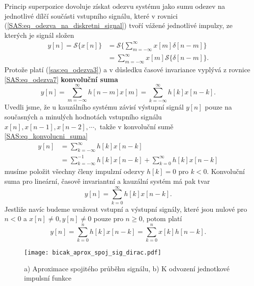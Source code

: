       Princip superpozice dovoluje získat odezvu systému jako sumu odezev na jednotlivé dílčí
      součásti vstupního signálu, které v rovnici (\ref{SAS:eq_odezva_na_diskretni_signal}) tvoří
      vážené jednotlivé impulzy, ze kterých je signál složen
      \begin{align}
        y[n]=\mathcal{S}\{x[n]\}
          &=\mathcal{S}\{\sum_{m=-\infty}^{\infty}x[m]\delta[n-m]\}  \nonumber \\
          &=\sum_{m=-\infty}^{\infty}x[m]\mathcal{S}\{\delta[n-m]\}. \label{SAS:eq_odezva7}
      \end{align}
      Protože platí (\ref{sas:eq_odezva3}) a v důsledku časové invariance vyplývá z rovnice
      \ref{SAS:eq_odezva7} \textbf{konvoluční suma} 
      \begin{equation}\label{SAS:eq_konvolucni_suma}
        y[n]=\sum_{m=-\infty}^{\infty}h[n-m]x[m]=\sum_{k=-\infty}^{\infty}h[k]x[n-k].
      \end{equation}
      Uvedli jsme, že u kauzálního systému závisí výstupní signál $y[n]$ pouze na současných a
      minulých hodnotách vstupního signálu $x[n], x[n-1], x[n-2], \cdots ,$ takže v konvoluční sumě
      \ref{SAS:eq_konvolucni_suma}
      \begin{align}
        y[n]&=\sum_{k=-\infty}^{\infty}h[k]x[n-k]                              \nonumber \\
            &=\sum_{k=-\infty}^{-1}h[k]x[n-k] + \sum_{k=0}^{\infty}h[k]x[n-k]  \label{tky:eq001}
      \end{align}
      musíme položit všechny členy impulzní odezvy $h[k]=0$ pro $k<0$. Konvoluční suma pro
      lineární, časově invariantní a kauzální systém má pak tvar
      \begin{equation}\label{SAS:eq_konvolucni_suma3}
        y[n]=\sum_{k=0}^{\infty}h[k]x[n-k].
      \end{equation}
      Jestliže navíc budeme uvažovat vstupní a výstupní signály, které jsou nulové pro $n<0$ a
      $x[n]\neq0, y[n]\neq0$ pouze pro $n\geq0$, potom platí
      \begin{equation}\label{SAS:eq_konvolucni_suma4}
        y[n]=\sum_{k=0}^{n}h[k]x[n-k]=\sum_{k=0}^{n}x[k]h[n-k].
      \end{equation}
  
      \begin{figure}[ht!]
        \centering
        \texttt{[image: bicak\_aprox\_spoj\_sig\_dirac.pdf]}
        \caption[Aproximace spojitého průběhu signálu]{a) Aproximace spojitého průběhu signálu, b)
                 K odvození jednotkové impulsní funkce}
        \label{SAS:fig_Bicak_aprox_spoj_fce}
      \end{figure}
  
